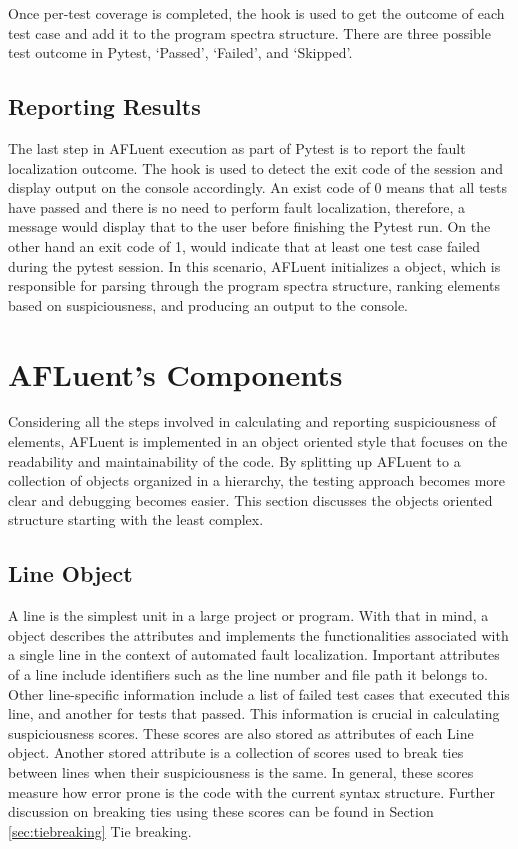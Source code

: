 Once per-test coverage is completed, the  hook
is used to get the outcome of each test case and add it to the program spectra
structure. There are three possible test outcome in Pytest, `Passed', `Failed',
and `Skipped'.

\subsection{Reporting Results}
\label{subsec:report_results}

The last step in AFLuent execution as part of Pytest is to report the fault
localization outcome. The  hook is used to detect the
exit code of the session and display output on the console accordingly. An exist
code of 0 means that all tests have passed and there is no need to perform fault
localization, therefore, a message would display that to the user before
finishing the Pytest run. On the other hand an exit code of 1, would indicate
that at least one test case failed during the pytest session. In this scenario,
AFLuent initializes a  object, which is responsible for parsing
through the program spectra structure, ranking elements based on suspiciousness,
and producing an output to the console.

\section{AFLuent's Components}
\label{sec:components}

Considering all the steps involved in calculating and reporting suspiciousness
of elements, AFLuent is implemented in an object oriented style that focuses on
the readability and maintainability of the code. By splitting up AFLuent to a
collection of objects organized in a hierarchy, the testing approach becomes more
clear and debugging becomes easier. This section discusses the objects oriented
structure starting with the least complex.

\subsection{Line Object}
\label{subsec:line_obj}

A line is the simplest unit in a large project or program. With that in mind, a
 object describes the attributes and implements the functionalities
associated with a single line in the context of automated fault localization.
Important attributes of a line include identifiers such as the line number and
file path it belongs to. Other line-specific information include a list of
failed test cases that executed this line, and another for tests that passed.
This information is crucial in calculating suspiciousness scores. These scores are also stored as
attributes of each Line object. Another stored attribute is a collection of
scores used to break ties between lines when their suspiciousness is the same.
In general, these scores measure how error prone is the code with the current
syntax structure. Further discussion on breaking ties using these scores can be
found in Section \ref{sec:tiebreaking} Tie breaking.

